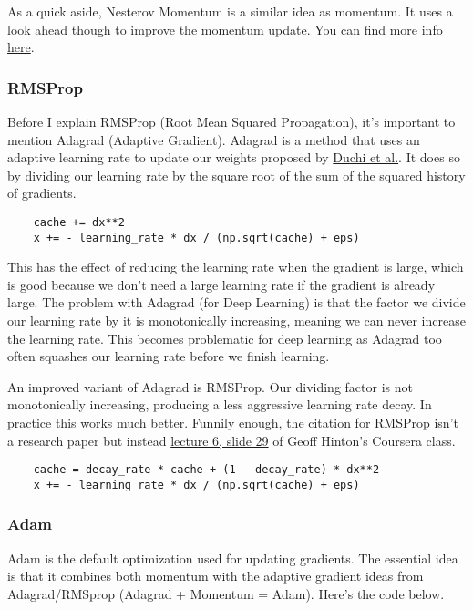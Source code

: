 \documentclass[12pt]{article}
\begin{document}
As a quick aside, Nesterov Momentum is a similar idea as momentum. It uses a look ahead though 
to improve the momentum update. You can find more info \href{https://cs231n.github.io/neural-networks-3/#sgd}{here}.

\subsubsection{RMSProp}
Before I explain RMSProp (Root Mean Squared Propagation), it's important to mention Adagrad (Adaptive
Gradient). Adagrad is a method that uses an adaptive learning rate to update our weights proposed by 
\href{https://jmlr.org/papers/v12/duchi11a.html}{Duchi et al.}. It does so 
by dividing our learning rate by the square root of the sum of the squared history of gradients. 

\begin{verbatim}
    cache += dx**2
    x += - learning_rate * dx / (np.sqrt(cache) + eps)
\end{verbatim}


This has the effect of reducing 
the learning rate when the gradient is large, which is good because we don't need a large learning rate
if the gradient is already large. The problem with Adagrad (for Deep Learning) is that the factor we divide 
our learning rate by it is monotonically increasing, meaning we can never increase the learning rate. 
This becomes problematic for deep learning as Adagrad too often squashes our learning rate before 
we finish learning. 

An improved variant of Adagrad is RMSProp. Our dividing factor is not monotonically increasing, 
producing a less aggressive learning rate decay. In practice this works much better. Funnily enough, 
the citation for RMSProp isn't a research paper but instead \href{http://www.cs.toronto.edu/~tijmen/csc321/slides/lecture_slides_lec6.pdf}
{lecture 6, slide 29} of Geoff Hinton's Coursera class. 

\begin{verbatim}
    cache = decay_rate * cache + (1 - decay_rate) * dx**2
    x += - learning_rate * dx / (np.sqrt(cache) + eps)
\end{verbatim}

\subsubsection{Adam}
Adam is the default optimization used for updating gradients. The essential idea is that it
combines both momentum with the adaptive gradient ideas from Adagrad/RMSprop (Adagrad + Momentum 
= Adam). Here's the code below. 
\end{document}
